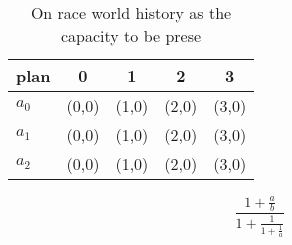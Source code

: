 \documentclass[a4paper]{article}
\begin{document}
\begin{table}
\begin{adjustbox}{width=0.6\columnwidth}
\begin{tabular}{|l|l|l|l|l|}
\hline
\textbf{plan} & \multicolumn{1}{c|}{\textbf{0}} & \multicolumn{1}{c|}{\textbf{1}} & \multicolumn{1}{c|}{\textbf{2}} & \multicolumn{1}{c|}{\textbf{3}} \\ \hline
\textbf{$a_0$}  & (0,0) & (1,0) & (2,0) & (3,0) \\ \hline
\textbf{$a_1$}  & (0,0) & (1,0) & (2,0) & (3,0) \\ \hline
\textbf{$a_2$}  & (0,0) & (1,0) & (2,0) & (3,0) \\ \hline
\end{tabular}
\end{adjustbox}
\caption{On race world history as the capacity to be prese
}
\end{table}

\[ \frac{1+\frac{a}{b}}{1+\frac{1}{1+\frac{1}{a}}} \]
\end{document}

